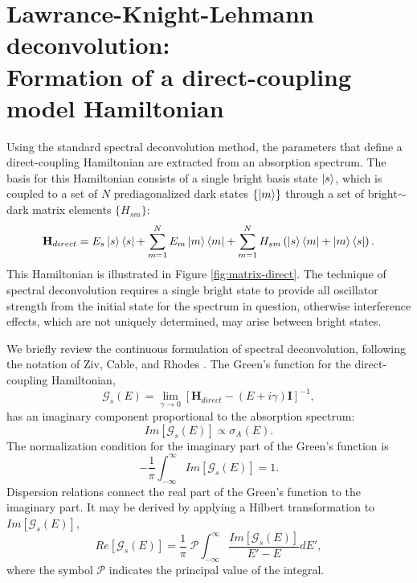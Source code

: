 \section{Lawrance-Knight-Lehmann deconvolution: \\
  Formation of a direct-coupling model Hamiltonian}

Using the standard spectral deconvolution method, the parameters that define a direct-coupling
Hamiltonian are extracted from an absorption spectrum.  The basis for
this Hamiltonian consists of a single bright basis state $\mathinner{|{s}\rangle}$,
which is coupled to a set of $N$ prediagonalized dark states $\lbrace
\mathinner{|{m}\rangle} \rbrace$ through a set of bright$\sim$dark matrix elements
$\lbrace H_{sm} \rbrace$:
\begin{equation}
  \mathbf{H}_{direct} = 
  E_s\mathinner{|{s}\rangle}\mathinner{\langle{s}|} 
  + \sum_{m=1}^N E_m\mathinner{|{m}\rangle}\mathinner{\langle{m}|}
  + \sum_{m=1}^N H_{sm} \left (
    \mathinner{|{s}\rangle}\mathinner{\langle{m}|} + \mathinner{|{m}\rangle}\mathinner{\langle{s}|}
  \right ).
\end{equation}
This Hamiltonian is illustrated in Figure \ref{fig:matrix-direct}.
The technique of spectral deconvolution requires a single bright state
to provide all oscillator strength from the initial state for the
spectrum in question, otherwise interference effects, which are not
uniquely determined, may arise between bright states.

We briefly review the continuous formulation of spectral
deconvolution, following the notation of Ziv, Cable, and Rhodes
\cite{ziv76, cable80}.  The Green's function for the direct-coupling
Hamiltonian,
\begin{equation}
  \label{eq:greens-function}
  \mathcal{G}_s(E) = 
  \underset{\gamma \rightarrow 0}{\lim}
  [\mathbf{H}_{direct} - (E + i \gamma)\mathbf{I}]^{-1},
\end{equation}
has an imaginary component proportional to the absorption spectrum:
\begin{equation}
  Im[\mathcal{G}_s(E)] \propto \sigma_A (E).
\end{equation}
The normalization condition for the imaginary part of the Green's
function is
\begin{equation}
  - \frac{1}{\pi} \int_{-\infty}^{\infty} Im[\mathcal{G}_s(E)] = 1.
\end{equation}
Dispersion relations connect the real part of the Green's function to
the imaginary part.  It may be derived by applying a Hilbert
transformation to $Im[\mathcal{G}_s(E)]$,
\begin{equation}
  \label{eq:hilbert}
  Re[\mathcal{G}_s(E)] = \frac{1}{\pi} \; 
  \mathcal{P} \int_{-\infty}^{\infty} 
  \frac{Im[\mathcal{G}_s(E)]}{E' - E} dE',
\end{equation}
where the symbol $\mathcal{P}$ indicates the principal value of the
integral.  

